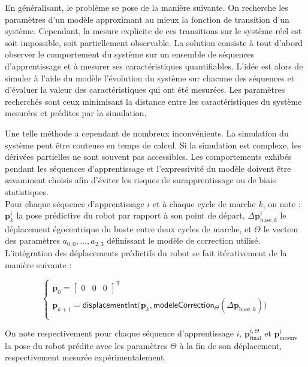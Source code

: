 En généralisant, le problème se pose de la manière suivante.
On recherche les paramètres d'un modèle approximant au mieux 
la fonction de transition d'un système.
Cependant, la mesure explicite de ces transitions sur le système réel est soit impossible,
soit partiellement observable.
La solution consiste à tout d'abord observer le comportement du système 
sur un ensemble de séquences d'apprentissage et à mesurer ses caractéristiques quantifiables.
L'idée est alors de simuler à l'aide du modèle l'évolution du système sur chacune des séquences
et d'évaluer la valeur des caractéristiques qui ont été mesurées.
Les paramètres recherchés sont ceux minimisant la distance entre les caractéristiques du système 
mesurées et prédites par la simulation.

Une telle méthode a cependant de nombreux inconvénients.
La simulation du système peut être couteuse en temps de calcul.
Si la simulation est complexe, les dérivées partielles ne sont souvent pas accessibles.
Les comportements exhibés pendant les séquences d'apprentissage et l'expressivité du modèle doivent
être savamment choisis afin d'éviter les risques de surapprentissage ou de biais statistiques.\\

Pour chaque séquence d'apprentissage $i$ et à chaque cycle de marche $k$, on note :
$\bm{p}_{k}^{i}$ la pose prédictive du robot par rapport à son point de départ, 
$\Delta \bm{p}_{\text{base}, k}^{i}$ le déplacement égocentrique du buste entre deux cycles de marche,
et $\Theta$ le vecteur des paramètres $a_{0,0},...,a_{2,3}$ définissant le modèle de correction utilisé.
L'intégration des déplacements prédictifs du robot se fait itérativement de la manière suivante :

$$
\begin{cases}
\bm{p}_{0} = \begin{bmatrix} 0 & 0 & 0 \end{bmatrix}^{\mathsf{T}} \\
    \bm{p}_{k+1} = \mathsf{displacementInt}\big(\bm{p}_{k}, \mathsf{modeleCorrection}_{\Theta}(\Delta \bm{p}_{\text{base}, k}) \big) \\
\end{cases}
$$

On note respectivement pour chaque séquence d'apprentissage $i$, $\bm{p}_{\text{final}}^{i, \Theta}$ 
et $\bm{p}_{\text{mesure}}^{i}$ la pose du robot prédite avec les paramètres $\Theta$
à la fin de son déplacement, respectivement mesurée expérimentalement.\\

